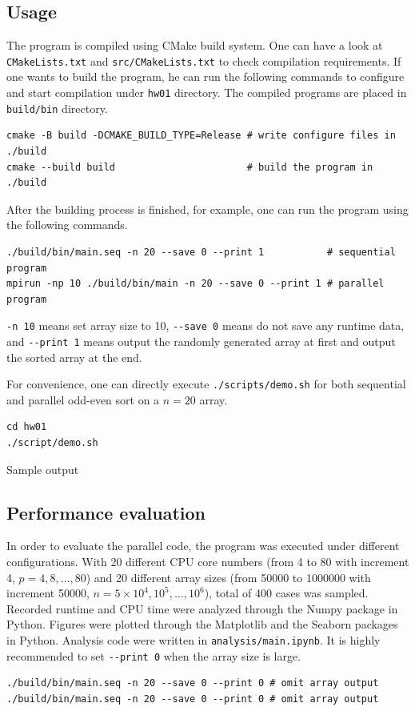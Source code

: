 \documentclass[twoside,12pt]{article}
\theoremstyle{definition}
\theoremstyle{remark}
\begin{document}
\subsection{Usage}
The program is compiled using CMake build system.
One can have a look at \lstinline|CMakeLists.txt| and \lstinline|src/CMakeLists.txt| 
to check compilation requirements.
If one wants to build the program, he can run the following commands to
configure and start compilation under \lstinline|hw01| directory.
The compiled programs are placed in \lstinline|build/bin| directory.
\begin{lstlisting}
cmake -B build -DCMAKE_BUILD_TYPE=Release # write configure files in ./build
cmake --build build                       # build the program in ./build
\end{lstlisting}
After the building process is finished, for example,
one can run the program using the following commands.
\begin{lstlisting}
./build/bin/main.seq -n 20 --save 0 --print 1           # sequential program
mpirun -np 10 ./build/bin/main -n 20 --save 0 --print 1 # parallel program 
\end{lstlisting}
\lstinline|-n 10| means set array size to 10, \lstinline|--save 0|
means do not save any runtime data, and \lstinline|--print 1|
means output the randomly generated array at first and output
the sorted array at the end.

For convenience, one can directly execute \lstinline|./scripts/demo.sh|
for both sequential and parallel odd-even sort on a $n=20$ array.
\begin{lstlisting}
cd hw01
./script/demo.sh
\end{lstlisting}
Sample output



\subsection{Performance evaluation}
In order to evaluate the parallel code, the program was executed under 
different configurations.
With 20 different CPU core numbers (from 4 to 80 with increment 4, $p=4, 8,\dots, 80$)
and 20 different array sizes (from 50000 to 1000000 with increment 50000, $n=5\times 10^4, 10^5, \dots, 10^6$), 
total of 400 cases was sampled.
Recorded runtime and CPU time were analyzed through the Numpy
package in Python.
Figures were plotted through the Matplotlib and the Seaborn packages in Python.
Analysis code were written in \lstinline|analysis/main.ipynb|.
It is highly recommended to set \lstinline|--print 0| when the array size is large.
\begin{lstlisting}
./build/bin/main.seq -n 20 --save 0 --print 0 # omit array output
./build/bin/main.seq -n 20 --save 0 --print 0 # omit array output
\end{lstlisting}
\end{document}
